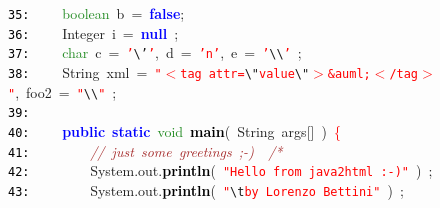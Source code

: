 \documentclass{article}
\begin{document}
\mbox{}\texttt{\textcolor{Black}{35:}} \ \ \ \ \textcolor{ForestGreen}{boolean}\ b\ \textcolor{BrickRed}{=}\ \textbf{\textcolor{Blue}{false}}\textcolor{BrickRed}{;} \\
\mbox{}\texttt{\textcolor{Black}{36:}} \ \ \ \ Integer\ i\ \textcolor{BrickRed}{=}\ \textbf{\textcolor{Blue}{null}}\ \textcolor{BrickRed}{;} \\
\mbox{}\texttt{\textcolor{Black}{37:}} \ \ \ \ \textcolor{ForestGreen}{char}\ c\ \textcolor{BrickRed}{=}\ \texttt{\textcolor{Red}{'}}\texttt{\textcolor{CarnationPink}{\textbackslash{}'}}\texttt{\textcolor{Red}{'}}\textcolor{BrickRed}{,}\ d\ \textcolor{BrickRed}{=}\ \texttt{\textcolor{Red}{'n'}}\textcolor{BrickRed}{,}\ e\ \textcolor{BrickRed}{=}\ \texttt{\textcolor{Red}{'}}\texttt{\textcolor{CarnationPink}{\textbackslash{}\textbackslash{}}}\texttt{\textcolor{Red}{'}}\ \textcolor{BrickRed}{;} \\
\mbox{}\texttt{\textcolor{Black}{38:}} \ \ \ \ String\ xml\ \textcolor{BrickRed}{=}\ \texttt{\textcolor{Red}{"{}$<$tag\ attr=}}\texttt{\textcolor{CarnationPink}{\textbackslash{}"{}}}\texttt{\textcolor{Red}{value}}\texttt{\textcolor{CarnationPink}{\textbackslash{}"{}}}\texttt{\textcolor{Red}{$>$\&auml;$<$/tag$>$"{}}}\textcolor{BrickRed}{,}\ foo2\ \textcolor{BrickRed}{=}\ \texttt{\textcolor{Red}{"{}}}\texttt{\textcolor{CarnationPink}{\textbackslash{}\textbackslash{}}}\texttt{\textcolor{Red}{"{}}}\ \textcolor{BrickRed}{;} \\
\mbox{}\texttt{\textcolor{Black}{39:}} \ \ \ \  \\
\mbox{}\texttt{\textcolor{Black}{40:}} \ \ \ \ \textbf{\textcolor{Blue}{public}}\ \textbf{\textcolor{Blue}{static}}\ \textcolor{ForestGreen}{void}\ \textbf{\textcolor{Black}{main}}\textcolor{BrickRed}{(}\ String\ args\textcolor{BrickRed}{[]}\ \textcolor{BrickRed}{)}\ \textcolor{Red}{\{} \\
\mbox{}\texttt{\textcolor{Black}{41:}} \ \ \ \ \ \ \ \ \textit{\textcolor{Brown}{//\ just\ some\ greetings\ ;-)\ \ /*}} \\
\mbox{}\texttt{\textcolor{Black}{42:}} \ \ \ \ \ \ \ \ System\textcolor{BrickRed}{.}out\textcolor{BrickRed}{.}\textbf{\textcolor{Black}{println}}\textcolor{BrickRed}{(}\ \texttt{\textcolor{Red}{"{}Hello\ from\ java2html\ :-)"{}}}\ \textcolor{BrickRed}{)}\ \textcolor{BrickRed}{;} \\
\mbox{}\texttt{\textcolor{Black}{43:}} \ \ \ \ \ \ \ \ System\textcolor{BrickRed}{.}out\textcolor{BrickRed}{.}\textbf{\textcolor{Black}{println}}\textcolor{BrickRed}{(}\ \texttt{\textcolor{Red}{"{}}}\texttt{\textcolor{CarnationPink}{\textbackslash{}t}}\texttt{\textcolor{Red}{by\ Lorenzo\ Bettini"{}}}\ \textcolor{BrickRed}{)}\ \textcolor{BrickRed}{;} \\
\end{document}

